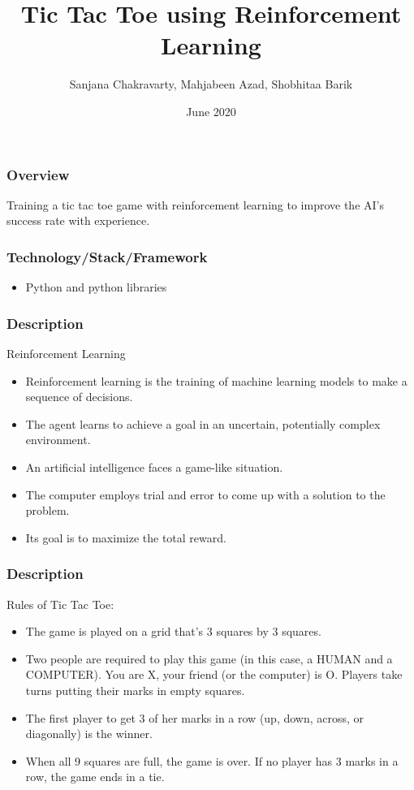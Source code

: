 \documentclass{beamer}
\title{Tic Tac Toe using Reinforcement Learning}
\author[Group 12]{Sanjana Chakravarty, Mahjabeen Azad, Shobhitaa Barik}
\date{June 2020}
\begin{document}
\begin{frame}
    \titlepage
\end{frame}

\begin{frame}
    \frametitle{Overview}
    Training a tic tac toe game with reinforcement learning to improve the AI’s success rate with experience.
\end{frame}

\begin{frame}
    \frametitle{Technology/Stack/Framework}
        \begin{itemize}
            \item<1-> Python and python libraries
        \end{itemize}
\end{frame}

\begin{frame}
    \frametitle{Description}
    \begin{block}{Reinforcement Learning}        
        \begin{itemize}
            \item<1-> Reinforcement learning is the training of machine learning models to make a sequence of decisions.
            \item<2-> The agent learns to achieve a goal in an uncertain, potentially complex environment.
            \item<3-> An artificial intelligence faces a game-like situation.
            \item<4-> The computer employs trial and error to come up with a solution to the problem.
            \item<5-> Its goal is to maximize the total reward.
        \end{itemize}
    \end{block}
\end{frame}

\begin{frame}
    \frametitle{Description}
          
     Rules of Tic Tac Toe:
    \begin{itemize} 
        \item The game is played on a grid that's 3 squares by 3 squares.
        \item Two people are required to play this game (in this case, a HUMAN and a COMPUTER). You are X, your friend (or the computer) is O. Players take turns putting their marks in empty squares.
        \item The first player to get 3 of her marks in a row (up, down, across, or diagonally) is the winner.
        \item When all 9 squares are full, the game is over. If no player has 3 marks in a row, the game ends in a tie.
    \end{itemize}
\end{frame}
\end{document}
